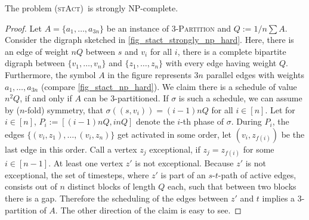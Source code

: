 \documentclass[runningheads]{llncs}
\numberwithin{equation}{section}
\newcommand{\set}[1]{\{ #1 \}}
\newcommand{\fromto}[2]{\set{#1, \ldots, #2}}
\newcommand{\stact}{\textsc{(stAct)}}
\begin{document}
\begin{lemma}
\label{lemma_st_act_strongly_np_hard}
The problem \stact\ is strongly NP-complete. 
\end{lemma}
\begin{proof}
Let $A = \fromto{a_1}{a_{3n}}$ be an instance of \textsc{3-Partition} and $Q := 1/n \sum A$. Consider the digraph sketched in \cref{fig_stact_strongly_np_hard}. Here, there is an edge of weight $nQ$ between $s$ and $v_i$ for all $i$, there is a complete bipartite digraph between $\fromto{v_1}{v_n}$ and $\fromto{z_1}{z_n}$ with every edge having weight $Q$. Furthermore, the symbol $A$ in the figure represents $3n$ parallel edges with weights $a_1, \ldots, a_{3n}$ (compare \cref{fig_stact_np_hard}). We claim there is a schedule of value $n^2Q$, if and only if $A$ can be 3-partitioned. If $\sigma$ is such a schedule, we can assume by ($n$-fold) symmetry, that $\sigma((s, v_i)) = (i - 1)nQ$ for all $i \in [n]$. Let for $i \in [n]$, $P_i := [(i-1)nQ, inQ]$ denote the $i$-th phase of $\sigma$. During $P_i$, the edges $\fromto{(v_i,z_1)}{(v_i,z_n)}$ get activated in some order, let $(v_i,z_{f(i)})$ be the last edge in this order. Call a vertex $z_j$ exceptional, if $z_j = z_{f(i)}$ for some $i \in [n-1]$. At least one vertex $z'$ is not exceptional. Because $z'$ is not exceptional, the set of timesteps, where $z'$ is part of an $s$-$t$-path of active edges, consists out of $n$ distinct blocks of length $Q$ each, such that between two blocks there is a gap. Therefore the scheduling of the edges between $z'$ and $t$ implies a 3-partition of $A$. The other direction of the claim is easy to see.
\end{proof}
\end{document}
